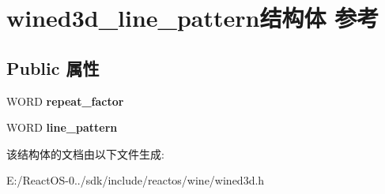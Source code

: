 \hypertarget{structwined3d__line__pattern}{}\section{wined3d\+\_\+line\+\_\+pattern结构体 参考}
\label{structwined3d__line__pattern}
\subsection*{Public 属性}
\begin{DoxyCompactItemize}
\item 
\mbox{\label{structwined3d__line__pattern_af6bace59e4b659194ca0b43c9feed6f5}} 
W\+O\+RD {\bfseries repeat\+\_\+factor}
\item 
\mbox{\label{structwined3d__line__pattern_aa2e85830069ce6761dd5896fc5941349}} 
W\+O\+RD {\bfseries line\+\_\+pattern}
\end{DoxyCompactItemize}


该结构体的文档由以下文件生成\+:\begin{DoxyCompactItemize}
\item 
E\+:/\+React\+O\+S-\/0../sdk/include/reactos/wine/wined3d.\+h\end{DoxyCompactItemize}
